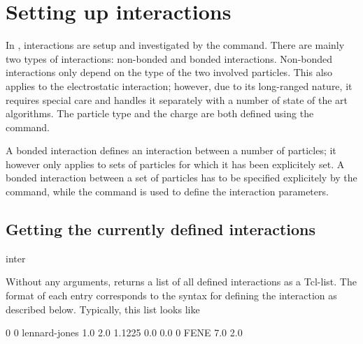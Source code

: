 %  
%   
%  
%  
%
\chapter{Setting up interactions}
\label{sec:inter}

In \es, interactions are setup and investigated by the 
command. There are mainly two types of interactions: non-bonded and
bonded interactions. Non-bonded interactions only depend on the type
of the two involved particles. This also applies to the electrostatic
interaction; however, due to its long-ranged nature, it requires
special care and \es handles it separately with a number of state of
the art algorithms. The particle type and the charge are both defined
using the  command.

A bonded interaction defines an interaction between a number of
particles; it however only applies to sets of particles for which it
has been explicitely set.  A bonded interaction between a set of
particles has to be specified explicitely by the 
command, while the  command is used to define the
interaction parameters.

\section{Getting the currently defined interactions}
\begin{essyntax}
  inter
\end{essyntax}

Without any arguments,  returns a list of all defined
interactions as a Tcl-list. The format of each entry corresponds to
the syntax for defining the interaction as described below. Typically,
this list looks like
\begin{tclcode}
  {0 0 lennard-jones 1.0 2.0 1.1225 0.0 0.0} {0 FENE 7.0 2.0}
\end{tclcode}

